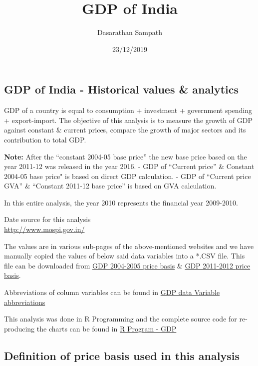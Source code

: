 \documentclass[]{article}
\title{GDP of India}
\author{Dasarathan Sampath}
\date{23/12/2019}
\begin{document}
\maketitle

\hypertarget{gdp-of-india---historical-values-analytics}{%
\subsection{GDP of India - Historical values \&
analytics}\label{gdp-of-india---historical-values-analytics}}

GDP of a country is equal to consumption + investment + government
spending + export-import. The objective of this analysis is to measure
the growth of GDP against constant \& current prices, compare the growth
of major sectors and its contribution to total GDP.

\textbf{Note:} After the ``constant 2004-05 base price'' the new base
price based on the year 2011-12 was released in the year 2016. - GDP of
``Current price'' \& Constant 2004-05 base price" is based on direct GDP
calculation. - GDP of ``Current price GVA'' \& ``Constant 2011-12 base
price'' is based on GVA calculation.

In this entire analysis, the year 2010 represents the financial year
2009-2010.

Date source for this analysis\\
\url{http://www.mospi.gov.in/}

The values are in various sub-pages of the above-mentioned websites and
we have manually copied the values of below said data variables into a
*.CSV file. This file can be downloaded from
\href{https://indiaelectiondata.in/datas/GDP_Const_2004_05.csv}{GDP
2004-2005 price basis} \&
\href{https://indiaelectiondata.in/datas/GDP_Const_2011_12.csv}{GDP
2011-2012 price basis}.

Abbreviations of column variables can be found in
\href{https://indiaelectiondata.in/datas/GDP_abbreviations.csv}{GDP data
Variable abbreviations}

This analysis was done in R Programming and the complete source code for
re-producing the charts can be found in
\href{\%22https://rpubs.com/Dasarathan/GDP_of_India\%22}{R Program -
GDP}

\hypertarget{definition-of-price-basis-used-in-this-analysis}{%
\subsection{Definition of price basis used in this
analysis}\label{definition-of-price-basis-used-in-this-analysis}}
\end{document}
